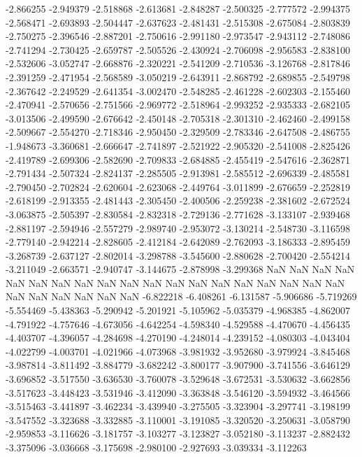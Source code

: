 -2.866255
-2.949379
-2.518868
-2.613681
-2.848287
-2.500325
-2.777572
-2.994375
-2.568471
-2.693893
-2.504447
-2.637623
-2.481431
-2.515308
-2.675084
-2.803839
-2.750275
-2.396546
-2.887201
-2.750616
-2.991180
-2.973547
-2.943112
-2.748086
-2.741294
-2.730425
-2.659787
-2.505526
-2.430924
-2.706098
-2.956583
-2.838100
-2.532606
-3.052747
-2.668876
-2.320221
-2.541209
-2.710536
-3.126768
-2.817846
-2.391259
-2.471954
-2.568589
-3.050219
-2.643911
-2.868792
-2.689855
-2.549798
-2.367642
-2.249529
-2.641354
-3.002470
-2.548285
-2.461228
-2.602303
-2.155460
-2.470941
-2.570656
-2.751566
-2.969772
-2.518964
-2.993252
-2.935333
-2.682105
-3.013506
-2.499590
-2.676642
-2.450148
-2.705318
-2.301310
-2.462460
-2.499158
-2.509667
-2.554270
-2.718346
-2.950450
-2.329509
-2.783346
-2.647508
-2.486755
-1.948673
-3.360681
-2.666647
-2.741897
-2.521922
-2.905320
-2.541008
-2.825426
-2.419789
-2.699306
-2.582690
-2.709833
-2.684885
-2.455419
-2.547616
-2.362871
-2.791434
-2.507324
-2.824137
-2.285505
-2.913981
-2.585512
-2.696339
-2.485581
-2.790450
-2.702824
-2.620604
-2.623068
-2.449764
-3.011899
-2.676659
-2.252819
-2.618199
-2.913355
-2.481443
-2.305450
-2.400506
-2.259238
-2.381602
-2.672524
-3.063875
-2.505397
-2.830584
-2.832318
-2.729136
-2.771628
-3.133107
-2.939468
-2.881197
-2.594946
-2.557279
-2.989740
-2.953072
-3.130214
-2.548730
-3.116598
-2.779140
-2.942214
-2.828605
-2.412184
-2.642089
-2.762093
-3.186333
-2.895459
-3.268739
-2.637127
-2.802014
-3.298788
-3.545600
-2.880628
-2.700420
-2.554214
-3.211049
-2.663571
-2.940747
-3.144675
-2.878998
-3.299368
NaN
NaN
NaN
NaN
NaN
NaN
NaN
NaN
NaN
NaN
NaN
NaN
NaN
NaN
NaN
NaN
NaN
NaN
NaN
NaN
NaN
NaN
NaN
NaN
NaN
-6.822218
-6.408261
-6.131587
-5.906686
-5.719269
-5.554469
-5.438363
-5.290942
-5.201921
-5.105962
-5.035379
-4.968385
-4.862007
-4.791922
-4.757646
-4.673056
-4.642254
-4.598340
-4.529588
-4.470670
-4.456435
-4.403707
-4.396057
-4.284698
-4.270190
-4.248014
-4.239152
-4.080303
-4.043404
-4.022799
-4.003701
-4.021966
-4.073968
-3.981932
-3.952680
-3.979924
-3.845468
-3.987814
-3.811492
-3.884779
-3.682242
-3.800177
-3.907900
-3.741556
-3.646129
-3.696852
-3.517550
-3.636530
-3.760078
-3.529648
-3.672531
-3.530632
-3.662856
-3.517623
-3.448423
-3.531946
-3.412090
-3.363848
-3.546120
-3.594932
-3.464566
-3.515463
-3.441897
-3.462234
-3.439940
-3.275505
-3.323904
-3.297741
-3.198199
-3.547552
-3.323688
-3.332885
-3.110001
-3.191085
-3.320520
-3.250631
-3.058790
-2.959853
-3.116626
-3.181757
-3.103277
-3.123827
-3.052180
-3.113237
-2.882432
-3.375096
-3.036668
-3.175698
-2.980100
-2.927693
-3.039334
-3.112263
